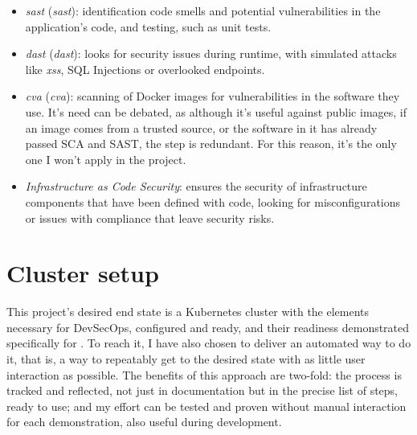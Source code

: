 \documentclass[11pt]{article}
\begin{document}
\begin{flushleft}
\begin{itemize}
            \item \textit{\acrlong{sast}} (\textit{\acrshort{sast}}): identification code smells and potential vulnerabilities in the application's code, and testing, such as unit tests.

            \item \textit{\acrlong{dast}} (\textit{\acrshort{dast}}): looks for security issues during runtime, with simulated attacks like \textit{\acrlong{xss}}, SQL Injections or overlooked endpoints.
            
            \item \textit{\acrlong{cva}} (\textit{\acrshort{cva}}): scanning of Docker images for vulnerabilities in the software they use. It's need can be debated, as although it's useful against public images, if an image comes from a trusted source, or the software in it has already passed SCA and SAST, the step is redundant. For this reason, it's the only one I won't apply in the project.
            
            \item \textit{Infrastructure as Code Security}: ensures the security of infrastructure components that have been defined with code, looking for misconfigurations or issues with compliance that leave security risks.
            

        \end{itemize}

    




\clearpage
\section{Cluster setup}
This project's desired end state is a Kubernetes cluster with the elements necessary for DevSecOps, configured and ready, and their readiness demonstrated specifically for \cite{misgit1}. To reach it, I have also chosen to deliver an automated way to do it, that is, a way to repeatably get to the desired state with as little user interaction as possible. The benefits of this approach are two-fold: the process is tracked and reflected, not just in documentation but in the precise list of steps, ready to use; and my effort can be tested and proven without manual interaction for each demonstration, also useful during development.
\linebreak


\end{flushleft}
\end{document}

